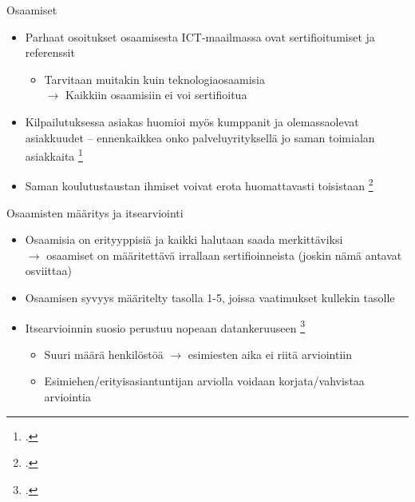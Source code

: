 \documentclass[first=purple,second=dblue,logo=redquo]{aaltoslides}
\begin{document}
\begin{frame}{Osaamiset}
\begin{itemize}
\item Parhaat osoitukset osaamisesta ICT-maailmassa ovat sertifioitumiset ja referenssit
\begin{itemize}
\item Tarvitaan muitakin kuin teknologiaosaamisia \\ $\rightarrow$ Kaikkiin osaamisiin ei voi sertifioitua
\end{itemize}
\item Kilpailutuksessa asiakas huomioi myös kumppanit ja olemassaolevat asiakkuudet -- ennenkaikkea onko palveluyrityksellä jo saman toimialan asiakkaita \footcite{ICT-haasteet}
\item Saman koulutustaustan ihmiset voivat erota huomattavasti toisistaan \footcite{self-assessment_in_skill_measurement}
\end{itemize}
\end{frame}
\begin{frame}{Osaamisten määritys ja itsearviointi}
\begin{itemize}
\item Osaamisia on erityyppisiä ja kaikki halutaan saada merkittäviksi \\ $\rightarrow$ osaamiset on määritettävä irrallaan sertifioinneista (joskin nämä antavat osviittaa)
\item Osaamisen syvyys määritelty tasolla 1-5, joissa vaatimukset kullekin tasolle
\item Itsearvioinnin suosio perustuu nopeaan datankeruuseen \footcite{self-assessment_in_skill_measurement}
\begin{itemize}
\item Suuri määrä henkilöstöä $\rightarrow$ esimiesten aika ei riitä arviointiin
\item Esimiehen/erityisasiantuntijan arviolla voidaan korjata/vahvistaa arviointia
\end{itemize}
\end{itemize}
\end{frame}
\end{document}
